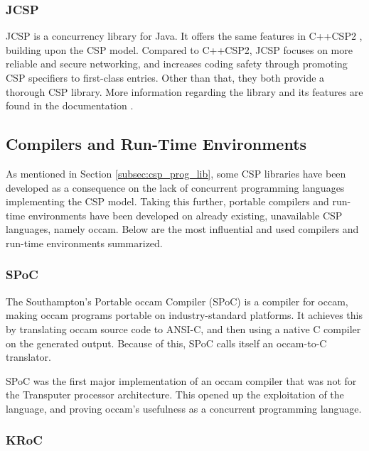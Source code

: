 \subsubsection{JCSP}
\label{sssec:jcsp}

JCSP \citep{jcsp} is a concurrency library for Java. It offers the same features in C++CSP2 \citep{c++csp2}, building upon the CSP model. Compared to C++CSP2, JCSP focuses on more reliable and secure networking, and increases coding safety through promoting CSP specifiers to first-class entries. Other than that, they both provide a thorough CSP library. More information regarding the library and its features are found in the documentation \citep{jcspdoc}. 


\subsection{Compilers and Run-Time Environments}
\label{subsec:csp_comp_runtime}

As mentioned in Section \ref{subsec:csp_prog_lib}, some CSP libraries have been developed as a consequence on the lack of concurrent programming languages implementing the CSP model. Taking this further, portable compilers and run-time environments have been developed on already existing, unavailable CSP languages, namely occam. Below are the most influential and used compilers and run-time environments summarized. 


\subsubsection{SPoC}
\label{sssec:spoc}

The Southampton's Portable occam Compiler (SPoC) \citep{spoc} is a compiler for occam, making occam programs portable on industry-standard platforms. It achieves this by translating occam source code to ANSI-C, and then using a native C compiler on the generated output. Because of this, SPoC calls itself an occam-to-C translator. 

SPoC was the first major implementation of an occam compiler that was not for the Transputer processor architecture. This opened up the exploitation of the language, and proving occam's usefulness as a concurrent programming language.


\subsubsection{KRoC}
\label{sssec:kroc}

